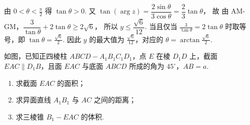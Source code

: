 \begin{solution}
由 \(0<\theta<\frac{\pi}{2}\) 得 \(\tan\theta>0\). 又
\(\tan(\arg z)=\dfrac{2\sin\theta}{3\cos\theta}=\dfrac23\tan\theta\)，
故
由 AM-GM，\(\dfrac3{\tan\theta}+2\tan\theta\ge 2\sqrt6\)，
所以 \(y\le \dfrac{\sqrt6}{12}\).
当且仅当 \(\frac3{\tan\theta}=2\tan\theta\) 时取等号，即 \(\tan\theta=\frac{\sqrt6}{2}\). 因此 \(y\) 的最大值为 \(\frac{\sqrt6}{12}\)，对应的 \(\theta=\arctan\frac{\sqrt6}{2}\).
\end{solution}

\begin{problem}
如图，已知正四棱柱 \(ABCD-A_1B_1C_1D_1\)，点 \(E\) 在棱 \(D_1D\) 上，截面 \(EAC\parallel D_1B\)，且面 \(EAC\) 与底面 \(ABCD\) 所成的角为 \(45^\circ\)，\(AB=a\).

\begin{enumerate}
\item 求截面 \(EAC\) 的面积；
\item 求异面直线 \(A_1B_1\) 与 \(AC\) 之间的距离；
\item 求三棱锥 \(B_1-EAC\) 的体积.
\end{enumerate}

\end{problem}


